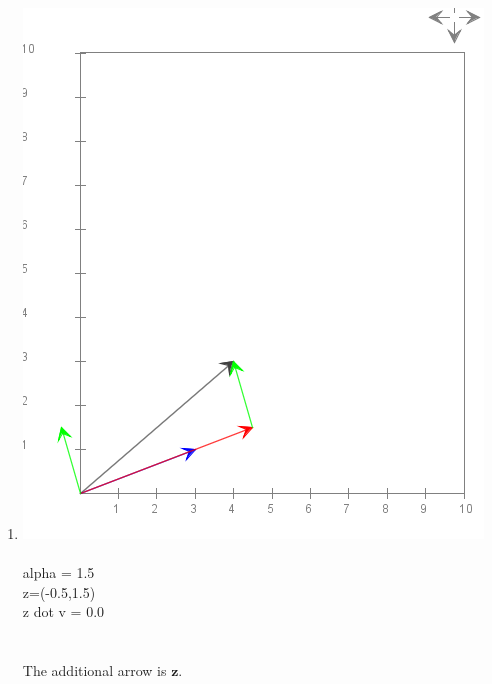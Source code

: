 \documentclass{article}
\begin{document}
\begin{enumerate}
\item 
	\includegraphics[scale=.5]{module7_exercise21}
	\\\\
	alpha = 1.5\\
	z=(-0.5,1.5)\\
	z dot v = 0.0\\
	\\\\
	The additional arrow is $\textbf{z}$.
	

\end{enumerate}
\end{document}
